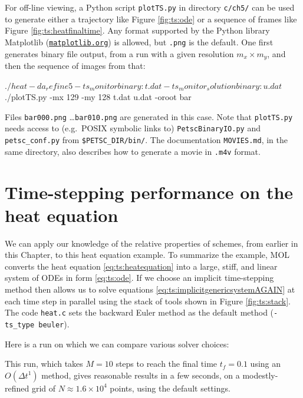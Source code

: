 For off-line viewing, a Python script \texttt{plotTS.py} in directory \texttt{c/ch5/} can be used to generate either a trajectory like Figure \ref{fig:ts:ode} or a sequence of frames like Figure \ref{fig:ts:heatfinaltime}.  Any format supported by the Python library Matplotlib (\href{http://matplotlib.org/}{\texttt{matplotlib.org}}) is allowed, but \texttt{.png} is the default.  One first generates \PETSc binary file output, from a run with a given resolution $m_x \times m_y$, and then the sequence of images from that:
\begin{cline}
$ ./heat -da_refine 5 -ts_monitor binary:t.dat -ts_monitor_solution binary:u.dat
$ ./plotTS.py -mx 129 -my 128 t.dat u.dat -oroot bar
\end{cline}
Files \texttt{bar000.png} \dots \texttt{bar010.png} are generated in this case.  Note that \texttt{plotTS.py} needs access to (e.g.~POSIX symbolic links to) \texttt{PetscBinaryIO.py} and \texttt{petsc\_conf.py} from \texttt{\$PETSC\_DIR/bin/}.  The documentation \texttt{MOVIES.md}, in the same directory, also describes how to generate a movie in \texttt{.m4v} format.


\section{Time-stepping performance on the heat equation}

We can apply our knowledge of the relative properties of schemes, from earlier in this Chapter, to this heat equation example.  To summarize the example, MOL converts the heat equation \eqref{eq:ts:heatequation} into a large, stiff, and linear system of ODEs in form \eqref{eq:ts:ode}.  If we choose an implicit time-stepping method then \PETSc allows us to solve equations \eqref{eq:ts:implicitgenericsystemAGAIN} at each time step in parallel using the stack of tools shown in Figure \ref{fig:ts:stack}.  The code \texttt{heat.c} sets the backward Euler method as the default method (\texttt{-ts\_type beuler}).

Here is a run on which we can compare various solver choices:
This run, which takes $M=10$ steps to reach the final time $t_f=0.1$ using an $O(\Delta t^1)$ method, gives reasonable results in a few seconds,  %
on a modestly-refined grid of $N  ^4$ points, using the default settings.

